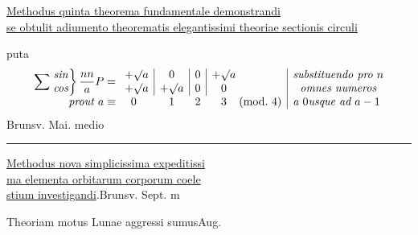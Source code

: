 \noindent{}\quad\underline{Methodus quinta theorema fundamentale demonstrandi}\\
\underline{se obtulit adiumento theorematis elegantissimi theoriae sectionis circuli}
\par\noindent\hspace*{12em}puta
\[
\begin{array}{r@{\;}cccc@{\;}l|l}
\displaystyle\sum\left.\begin{matrix}\mathit{sin}\\\mathit{cos}\end{matrix}\right\}\frac{nn}{a}P=
&\multicolumn{1}{c|}{\begin{matrix}+\surd a\\+\surd a\end{matrix}}
&\multicolumn{1}{c|}{\begin{matrix}0\\+\surd a\end{matrix}}
&\multicolumn{1}{c|}{\begin{matrix}0\\0\end{matrix}}
&\begin{matrix}+\surd a\\0\end{matrix}&
&\begin{matrix}\text{\itshape substituendo pro }n\\\text{\itshape omnes numeros}\end{matrix}\\[5pt]
\text{\itshape prout }a\equiv&0&1&2&3&(\mathrm{mod.}\ 4)&\text{\itshape a }0\text{\itshape usque ad }a-1
\end{array}
\]
\noindent\hfill Brunsv. Mai. medio
\par\smallskip\noindent\rule{\linewidth}{.3pt}

\noindent\DiaryHashSeven\quad\underline{Methodus nova simplicissima expeditissi}\\
\underline{ma  elementa orbitarum corporum coele}\\
\underline{stium investigandi}.\hfill Brunsv. Sept. m

\medskip
\noindent\DiaryHashSeven\quad Theoriam motus Lunae aggressi sumus\hfill Aug.
\endgroup
